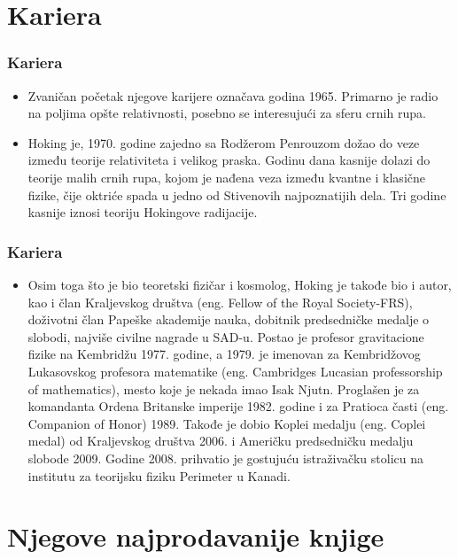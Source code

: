 \documentclass{beamer}
\begin{document}
\section{Kariera}

\begin{frame}[fragile]\frametitle{Kariera}
\begin{itemize}	 \fontsize{9}{6}\selectfont
\item  Zvaničan početak njegove karijere označava godina 1965. Primarno je radio na poljima opšte relativnosti, posebno se interesujući za sferu crnih rupa.
\item Hoking je, 1970. godine zajedno sa Rodžerom Penrouzom dožao do veze između teorije relativiteta i velikog praska. Godinu dana kasnije dolazi do teorije malih crnih rupa, kojom je nađena veza između kvantne i klasične fizike, čije oktriće spada u jedno od Stivenovih najpoznatijih dela. Tri godine kasnije iznosi teoriju Hokingove radijacije. 
\end{itemize}
\end{frame}
\begin{frame}[fragile]\frametitle{Kariera}
	\begin{itemize}	 \fontsize{9}{6}\selectfont	
	\item  Osim toga što je bio teoretski fizičar i kosmolog, Hoking je takođe bio i autor, kao i član Kraljevskog društva (eng. Fellow of the Royal Society-FRS), doživotni član Papeške akademije nauka, dobitnik predsedničke medalje o slobodi, najviše civilne nagrade u SAD-u.	 Postao je profesor gravitacione fizike na Kembridžu 1977. godine, a 1979. je imenovan za Kembridžovog Lukasovskog profesora matematike (eng. Cambridges Lucasian professorship of mathematics), mesto koje je nekada imao Isak Njutn. Proglašen je za komandanta Ordena Britanske imperije 1982. godine i za Pratioca časti (eng. Companion of Honor) 1989. Takođe je dobio Koplei medalju (eng. Coplei medal) od Kraljevskog društva 2006. i Američku predsedničku medalju slobode 2009. Godine 2008. prihvatio je gostujuću istraživačku stolicu na institutu za teorijsku fiziku Perimeter u Kanadi.
	\end{itemize}
	\end{frame}
\section{Njegove najprodavanije knjige}
\end{document}
